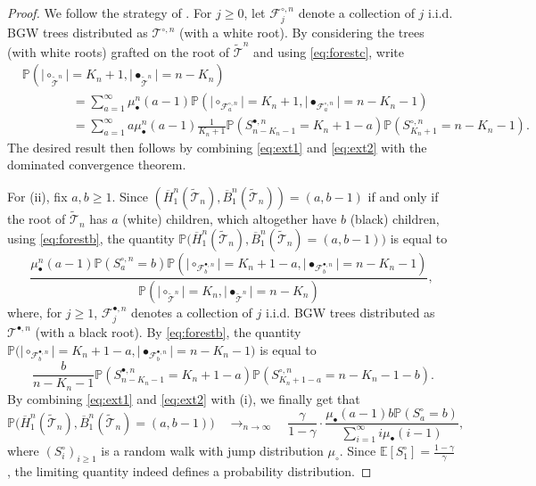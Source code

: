 \documentclass[10pt]{amsart}
\theoremstyle{definition}\newtheorem{defi}[theo]{Definition}\newtheorem{rema}[theo]{Remark}\newtheorem{exam}[theo]{Example}\newtheorem{exem}[theo]{Example}\newtheorem{nota}[theo]{Notation}
\providecommand{\abs}[1]{\lvert#1\rvert}
\def\mub{\mu_{\bullet}}
\def\muc{\mu_{\circ}}
\def\mubn{\mu_{\bullet}^{n}}
\def\Sbn{S^{\bullet,n}}
\def\Scn{S^{\circ,n}}
\def\oB{\overline{B}}
\def\oH{\overline{H}}
\def\tTs{\tilde{\Ts}}
\def \Tsbn{\Ts^{\bullet,n}}
\def \Tscn{\Ts^{\circ,n}}
\def\Ts{\mathscr{T}}
\newcommand\Es[1]{\mathbb{E}\left[#1\right]}
\renewcommand\Pr[1]{\mathbb{P}\left(#1\right)}
\newcommand\Prb[1]{\mathbb{P}\big(#1\big)}
\begin{document}
\begin{proof} We follow the strategy of \cite[Lemma 5.7]{KM16}.
For $j \geq 0$, let $ \mathscr{F}^{\circ,n}_{j}$ denote a collection of $j$ i.i.d. BGW trees distributed as  $ \Tscn$ (with a white root). By considering the trees (with white roots) grafted on the root of $\tTs^{n}$  and using \eqref{eq:forestc}, write
\begin{align*}
&\Pr{\abs{\circ_{\tTs^{n}}}=K_{n}+1, \abs{\bullet_{\tTs^{n}}}=n-K_{n}} \\
& \qquad\qquad = \sum_{a=1}^{\infty} \mubn(a-1) \Pr{\abs{ \circ_{ \mathscr{F}^{\circ,n}_{a}}}=K_{n}+1, \abs{\bullet_{ \mathscr{F}^{\circ,n}_{a}}}=n-K_n-1} \\
& \qquad \qquad =\sum_{a=1}^{\infty} a \mubn(a-1) \frac{1}{K_{n}+1} \Pr{\Sbn_{n-K_{n}-1}=K_{n}+1-a} \Pr{\Scn_{K_{n}+1}=n-K_{n}-1}.
\end{align*}
The desired result then follows by combining \eqref{eq:ext1} and \eqref{eq:ext2} with the dominated convergence theorem.



For (ii), fix $a,b \geq 1$. Since $(\oH^{n}_{1}(\tTs_{n}),\oB^{n}_{1}(\tTs_{n}))=(a,b-1)$ if and only if the root of $\tTs_{n}$ has $a$ (white) children, which altogether have $b$ (black) children, using \eqref{eq:forestb},  the quantity $\Prb{\oH^{n}_{1}(\tTs_{n}),\oB^{n}_{1}(\tTs_{n})=(a,b-1)}$ is equal to
\[
 \frac{\mubn(a-1) \Pr{\Scn_{a}=b}  \Pr{\abs{ \circ_{ \mathscr{F}^{\bullet,n}_{b}}}=K_{n}+1-a, \abs{\bullet_{ \mathscr{F}^{\bullet,n}_{b}}}=n-K_n-1}}{\Pr{\abs{\circ_{\tTs^{n}}}=K_{n}, \abs{\bullet_{\tTs^{n}}}=n-K_{n}}},
\]
where, for $j \geq 1$,  $ \mathscr{F}^{\bullet,n}_{j}$ denotes a collection of $j$ i.i.d. BGW trees distributed as  $ \Tsbn$ (with a black root).
By \eqref{eq:forestb}, the quantity $\Prb{\abs{ \circ_{ \mathscr{F}^{\bullet,n}_{b}}}=K_{n}+1-a, \abs{\bullet_{ \mathscr{F}^{\bullet,n}_{b}}}=n-K_n-1}$ is equal to
\[\ \frac{b}{n-K_{n}-1} \Pr{\Sbn_{n-K_{n}-1}=K_{n}+1-a} \Pr{\Scn_{K_{n}+1-a} =n-K_{n}-1-b}.\]
 By  combining \eqref{eq:ext1} and \eqref{eq:ext2} with (i), we finally get that
 \[\Prb{\oH^{n}_{1}(\tTs_{n}),\oB^{n}_{1}(\tTs_{n})=(a,b-1)}  \quad \mathop{\longrightarrow}_{n \rightarrow \infty} \quad  \frac{\gamma}{1-\gamma} \cdot \frac{\mub(a-1)  b\Pr{S^{\circ}_{a}=b}}{\sum_{i=1}^{\infty} i \mub(i-1)},\]
 where $(S^{\circ}_{i})_{i \geq 1}$ is a random walk with jump distribution $\muc$.
Since $\Es{S^{\circ}_{1}}= \frac{1-\gamma}{\gamma}$, the limiting quantity indeed defines a probability distribution.


\end{proof}
\end{document}
